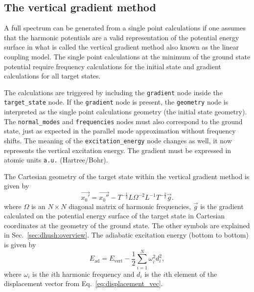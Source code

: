 \documentclass[11pt]{article}
\begin{document}
\subsection{The vertical gradient method}
\label{sec:para:vertical_gradient}
A full spectrum can be generated from a single point calculations if one assumes that the harmonic potentials are a valid representation of the potential energy surface in what is called the vertical gradient method also known as the linear coupling model. The single point calculations at the minimum of the ground state potential require frequency calculations for the initial state and gradient calculations for all target states.

The calculations are triggered by including the {\tt{}gradient} node inside the {\tt{}target\_state} node. If the {\tt{}gradient} node is present, the {\tt{}geometry} node is interpreted as the single point calculations geometry (the initial state geometry). The {\tt{}normal\_modes} and {\tt{}frequencies} nodes must also correspond to the ground state, just as expected in the parallel mode approximation without frequency shifts. The meaning of the {\tt{}excitation\_energy} node changes as well, it now represents the vertical excitation energy. The gradient must be expressed in atomic units {\tt{}a.u.} (Hartree/Bohr).

The Cartesian geometry of the target state within the vertical gradient method is given by
\begin{equation}
    \label{eq:VG_geometry}
    \vec{x _0 '}
    =
    \vec{x _0 ''}
    -
    T ^{-\frac{1}{2}} L 
    \Omega ^{-2} 
    L ^{-1} T ^{-\frac{1}{2}} 
    \vec{g}.
\end{equation}
where $\Omega$ is an $N \times N$ diagonal matrix of harmonic frequencies, $\vec{g}$ is the gradient calculated on the potential energy surface of the target state in Cartesian coordinates at the geometry of the ground state. The other symbols are explained in Sec.~\ref{sec:dhush:overview}. The adiabatic excitation energy (bottom to bottom) is given by
\begin{equation}
    \label{eq:VG_energy}
    E _\text{ad} = E _\text{vert} - \frac{1}{2} \sum _{i = 1} ^N \omega _i ^2 d _i ^2,
\end{equation}
where $\omega _i$ is the $i$th harmonic frequency and $d _i$ is the $i$th element of the displacement vector from Eq.~\eqref{eq:displacement_vec}.

\end{document}
